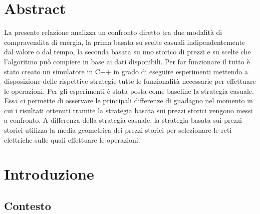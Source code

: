 \documentclass[12pt,a4paper,oneside]{report}
\begin{document}


\chapter*{Abstract}

La presente relazione analizza un confronto diretto tra due modalità
di compravendita di energia, la prima basata su scelte casuali
indipendentemente dal valore o dal tempo, la seconda basata su uno
storico di prezzi e su scelte che l'algoritmo può compiere in base ai dati disponibili.
Per far funzionare il tutto è stato creato un simulatore in C++ in grado
di eseguire esperimenti mettendo a disposizione delle rispettive strategie
tutte le funzionalità necessarie per effettuare le operazioni.
Per gli esperimenti è stata posta come baseline la strategia casuale.
Essa ci permette di osservare le principali differenze di guadagno
nel momento in cui i risultati ottenuti tramite la strategia basata
sui prezzi storici vengono messi a confronto.
A differenza della strategia casuale, la strategia basata sui prezzi
storici utilizza la media geometrica dei prezzi storici per selezionare
le reti elettriche sulle quali effettuare le operazioni.

\clearpage



\tableofcontents

\clearpage






\chapter{Introduzione}


\section{Contesto}
\end{document}
